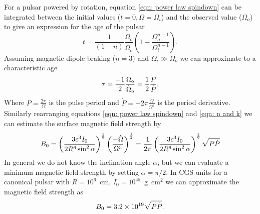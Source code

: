 For a pulsar powered by rotation, equation \eqref{eqn: power law spindown} can
be integrated between the initial values ($t=0, \Omega=\Omega_{i}$) and the
observed value ($\Omega_{o}$) to give an expression for the age of the pulsar
\begin{equation}
    t = \frac{1}{(1-n)} \frac{\Omega_{o}}{\dot\Omega_{o}} 
        \left(1 - \frac{\Omega_{o}^{n-1}}{\Omega_{i}^{n-1}}\right).
\label{eqn: characteristic age}
\end{equation}
Assuming magnetic dipole braking ($n=3$) and $\Omega_{i} \gg \Omega_{o}$ we can
approximate to a characteristic age 
\begin{equation}
    \tau = \frac{-1}{2}\frac{\Omega_{\textrm{o}}}{\dot\Omega_{o}}
         = \frac{1}{2}\frac{P}{\dot{P}}.
\end{equation}
Where $P=\frac{2\pi}{\Omega}$ is the pulse period and
$\dot{P}=-2\pi\frac{\dot{\Omega}}{\Omega^{2}}$ is the period derivative.
Similarly
rearranging equations \eqref{eqn: power law spindown} and 
\eqref{eqn: n and k} we can estimate the surface magnetic field strength by
\begin{equation}
    B_{0} = \left(\frac{3 c^{3} I_{0}}{2R^{6} \sin^{2}\alpha}\right)^{\frac{1}{2}} 
            \left(\frac{-\dot{\Omega}}{\Omega^{3}}\right)^{\frac{1}{2}}
          = \frac{1}{2\pi}\left(\frac{3 c^{3} I_{0}}{2R^{6} \sin^{2}\alpha}\right)^{\frac{1}{2}}
           \sqrt{P \dot{P}}
\label{eqn: surface magnetic field}
\end{equation}
In general we do not know the inclination angle $\alpha$, but we can evaluate a 
minimum magnetic field strength by setting $\alpha=\pi/2$. In CGS units for a
canonical pulsar with $R=10^{6}$~cm, $I_{0}=10^{45}$~g~cm$^{2}$ we can approximate
the magnetic field strength as
\begin{equation}
    B_{0} = 3.2 \times 10^{19} \sqrt{P \dot{P}}.
\label{eqn: surface magnetic field canonical}
\end{equation}


